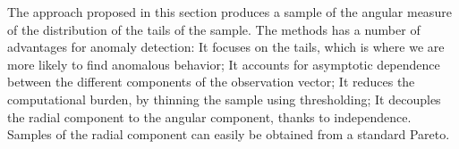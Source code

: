 The approach proposed in this section produces a sample of the angular measure 
    of the distribution of the tails of the sample. The methods has a number of 
    advantages for anomaly detection: It focuses on the tails, which is where we 
    are more likely to find anomalous behavior;  It accounts for asymptotic 
    dependence between the different components of the observation vector; It 
    reduces the computational burden, by thinning the sample using thresholding; 
    It decouples the radial component to the angular component, thanks to 
    independence. Samples of the radial component can easily be obtained from a 
    standard Pareto.

